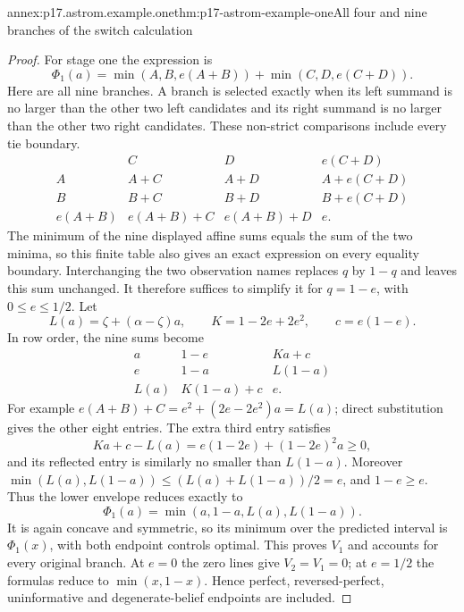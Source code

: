 \begin{annexitem}{annex:p17.astrom.example.one}{thm:p17-astrom-example-one}{All four and nine branches of the switch calculation}
\begin{proof}
For stage one the expression is
\[
 \Phi_1(a)=\min(A,B,e(A+B))+\min(C,D,e(C+D)).
\]
Here are all nine branches. A branch is selected
exactly when its left summand is no larger than the
other two left candidates and its right summand is
no larger than the other two right candidates.
These non-strict comparisons include every tie boundary.
\[
 \begin{array}{c|ccc}
  &C&D&e(C+D)\\ \hline
 A&A+C&A+D&A+e(C+D)\\
 B&B+C&B+D&B+e(C+D)\\
 e(A+B)&e(A+B)+C&e(A+B)+D&e .
 \end{array}
\]
The minimum of the nine displayed affine sums equals
the sum of the two minima, so this finite table also
gives an exact expression on every equality boundary.
Interchanging the two observation names replaces \(q\)
by \(1-q\) and leaves this sum unchanged.
It therefore suffices to simplify it for \(q=1-e\),
with \(0\leq e\leq1/2\).
Let
\[
 L(a)=\zeta+(\alpha-\zeta)a,\qquad
 K=1-2e+2e^2,\qquad c=e(1-e).
\]
In row order, the nine sums become
\[
 \begin{array}{ccc}
 a&1-e&Ka+c\\
 e&1-a&L(1-a)\\
 L(a)&K(1-a)+c&e .
 \end{array}
\]
For example
\(e(A+B)+C=e^2+(2e-2e^2)a=L(a)\);
direct substitution gives the other eight entries.
The extra third entry satisfies
\[
           Ka+c-L(a)=e(1-2e)+(1-2e)^2a\geq0,
\]
and its reflected entry is similarly no smaller
than \(L(1-a)\).
Moreover
\(\min(L(a),L(1-a))\leq(L(a)+L(1-a))/2=e\),
and \(1-e\geq e\).
Thus the lower envelope reduces exactly to
\[
                \Phi_1(a)=\min(a,1-a,L(a),L(1-a)).
\]
It is again concave and symmetric, so its minimum
over the predicted interval is \(\Phi_1(x)\), with
both endpoint controls optimal. This proves \(V_1\)
and accounts for every original branch.
At \(e=0\) the zero lines give \(V_2=V_1=0\);
at \(e=1/2\) the formulas reduce to
\(\min(x,1-x)\). Hence perfect, reversed-perfect,
uninformative and degenerate-belief endpoints are included.


\end{proof}
\end{annexitem}
